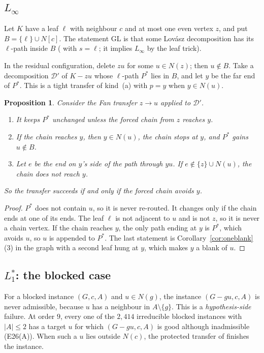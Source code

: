 \documentclass[11pt]{amsart}
\newtheorem{proposition}[theorem]{Proposition}
\theoremstyle{definition}
\newcommand{\cD}{\mathcal D}
\begin{document}
\subsection{\texorpdfstring{$L_\infty$}{L-infinity}}
Let $K$ have a leaf $\ell$ with neighbour $c$ and at most one even vertex $z$, and put
$B=\{\ell\}\cup N[c]$. The statement GL is that some Lov\'asz decomposition has its $\ell$-path
inside $B$ (\cite[Conjecture~8.2]{RD} with $s=\ell$; it implies $L_\infty$ by the leaf trick).

In the residual configuration, delete $zu$ for some $u\in N(z)$; then $u\notin B$. Take a
decomposition $\cD'$ of $K-zu$ whose $\ell$-path $P^*$ lies in $B$, and let $y$ be the far end of
$P^*$. This is a tight transfer of kind~(a) with $p=y$ when $y\in N(u)$.

\begin{proposition}\label{prop:linfty}
Consider the Fan transfer $z\to u$ applied to $\cD'$.
\begin{enumerate}
\item It keeps $P^*$ unchanged unless the forced chain from $z$ reaches $y$.
\item If the chain reaches $y$, then $y\in N(u)$, the chain stops at $y$, and $P^*$ gains $u\notin B$.
\item Let $e$ be the end on $y$'s side of the path through $yu$. If $e\notin\{z\}\cup N(u)$, the
chain does not reach $y$.
\end{enumerate}
So the transfer succeeds if and only if the forced chain avoids $y$.
\end{proposition}

\begin{proof}
$P^*$ does not contain $u$, so it is never re-routed. It changes only if the chain ends at one of its
ends. The leaf $\ell$ is not adjacent to $u$ and is not $z$, so it is never a chain vertex. If the
chain reaches $y$, the only path ending at $y$ is $P^*$, which avoids $u$, so $u$ is appended to
$P^*$. The last statement is Corollary~\ref{cor:oneblank}(3) in the graph with a second leaf hung at
$y$, which makes $y$ a blank of $u$.
\end{proof}

\subsection{\texorpdfstring{$L_1^*$}{L1*}: the blocked case}
For a blocked instance $(G,c,A)$ and $u\in N(g)$, the instance $(G-gu,c,A)$ is never admissible,
because $u$ has a neighbour in $A\setminus\{g\}$. This is a \emph{hypothesis-side} failure. At order
$9$, every one of the $2{,}414$ irreducible blocked instances with $|A|\le2$ has a target $u$ for which
$(G-gu,c,A)$ is good although inadmissible (E26(A)). When such a $u$ lies outside $N(c)$, the
protected transfer of \cite[Lemma~2.4]{L1S} finishes the instance.
\end{document}
